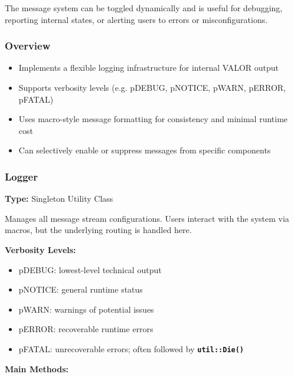 The message system can be toggled dynamically and is useful for debugging, reporting internal states, or alerting users to errors or misconfigurations.

\vspace{1em}
\subsubsection*{Overview}

\begin{itemize}
  \item Implements a flexible logging infrastructure for internal VALOR output
  \item Supports verbosity levels (e.g. {\color{amber}pDEBUG}, {\color{amber}pNOTICE}, {\color{amber}pWARN}, {\color{amber}pERROR}, {\color{amber}pFATAL})
  \item Uses macro-style message formatting for consistency and minimal runtime cost
  \item Can selectively enable or suppress messages from specific components
\end{itemize}

\vspace{1em}
\subsubsection*{\color{cadmiumgreen}\bf Logger}

\textbf{Type:} Singleton Utility Class

Manages all message stream configurations.  
Users interact with the system via macros, but the underlying routing is handled here.

\vspace{0.5em}
\noindent\textbf{Verbosity Levels:}

\begin{itemize}
  \item {\color{amber}pDEBUG}: lowest-level technical output
  \item {\color{amber}pNOTICE}: general runtime status
  \item {\color{amber}pWARN}: warnings of potential issues
  \item {\color{amber}pERROR}: recoverable runtime errors
  \item {\color{amber}pFATAL}: unrecoverable errors; often followed by {\bf \tt util::Die()}
\end{itemize}

\vspace{0.5em}
\noindent\textbf{Main Methods:}

